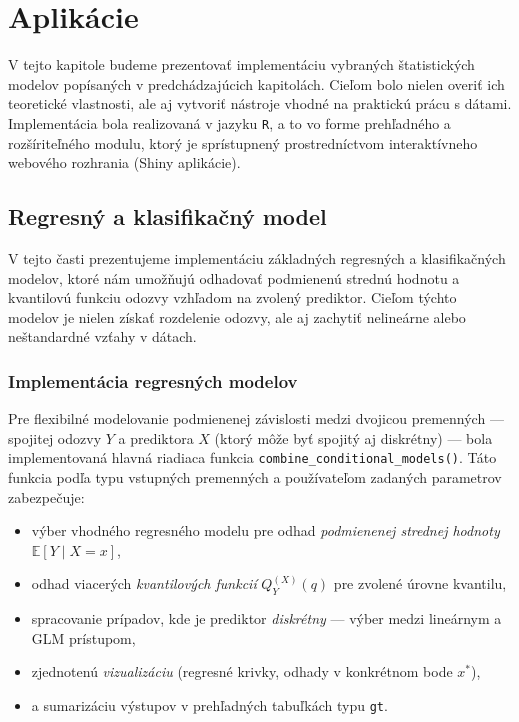 \chapter{Aplikácie}\label{chap:applications}

V tejto kapitole budeme prezentovať implementáciu vybraných štatistických modelov popísaných v predchádzajúcich kapitolách. Cieľom bolo nielen overiť ich teoretické vlastnosti, ale aj vytvoriť nástroje vhodné na praktickú prácu s dátami. Implementácia bola realizovaná v jazyku \texttt{R}, a to vo forme prehľadného a rozšíriteľného modulu, ktorý je sprístupnený prostredníctvom interaktívneho webového rozhrania (Shiny aplikácie).

\section{Regresný a klasifikačný model}\label{sec:app_regression_class}

V tejto časti prezentujeme implementáciu základných regresných a klasifikačných modelov, ktoré nám umožňujú odhadovať podmienenú strednú hodnotu a kvantilovú funkciu odozvy vzhľadom na zvolený prediktor. Cieľom týchto modelov je nielen získať rozdelenie odozvy, ale aj zachytiť nelineárne alebo neštandardné vzťahy v dátach.

\subsection{Implementácia regresných modelov}\label{subsec:regression_implementation}

Pre flexibilné modelovanie podmienenej závislosti medzi dvojicou premenných — spojitej odozvy $Y$ a prediktora $X$ (ktorý môže byť spojitý aj diskrétny) — bola implementovaná hlavná riadiaca funkcia \texttt{combine\_conditional\_models()}. Táto funkcia podľa typu vstupných premenných a používateľom zadaných parametrov zabezpečuje:

\begin{itemize}
  \item výber vhodného regresného modelu pre odhad \textit{podmienenej strednej hodnoty} $\mathbb{E}[Y \mid X = x]$,
  \item odhad viacerých \textit{kvantilových funkcií} $Q_Y^{(X)}(q)$ pre zvolené úrovne kvantilu,
  \item spracovanie prípadov, kde je prediktor \textit{diskrétny} — výber medzi lineárnym a GLM prístupom,
  \item zjednotenú \textit{vizualizáciu} (regresné krivky, odhady v konkrétnom bode $x^*$),
  \item a sumarizáciu výstupov v prehľadných tabuľkách typu \texttt{gt}.
\end{itemize}

